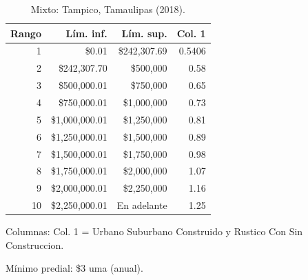\begin{table}[htbp]
\centering
\small
\begin{tabular}{rrrr}
\toprule
Rango & Lím. inf. & Lím. sup. & Col. 1 \\
\midrule
1 & \$0.01 & \$242{,}307.69 & 0.5406 \\
2 & \$242{,}307.70 & \$500{,}000 & 0.58 \\
3 & \$500{,}000.01 & \$750{,}000 & 0.65 \\
4 & \$750{,}000.01 & \$1{,}000{,}000 & 0.73 \\
5 & \$1{,}000{,}000.01 & \$1{,}250{,}000 & 0.81 \\
6 & \$1{,}250{,}000.01 & \$1{,}500{,}000 & 0.89 \\
7 & \$1{,}500{,}000.01 & \$1{,}750{,}000 & 0.98 \\
8 & \$1{,}750{,}000.01 & \$2{,}000{,}000 & 1.07 \\
9 & \$2{,}000{,}000.01 & \$2{,}250{,}000 & 1.16 \\
10 & \$2{,}250{,}000.01 & En adelante & 1.25 \\
\bottomrule
\end{tabular}
\par\smallskip\footnotesize Columnas: Col. 1 = Urbano Suburbano Construido y Rustico Con Sin Construccion.
\caption{Mixto: Tampico, Tamaulipas (2018).}
\label{tab:esquema-mixto}

\par\smallskip\footnotesize Mínimo predial: \$3 uma (anual).
\end{table}
